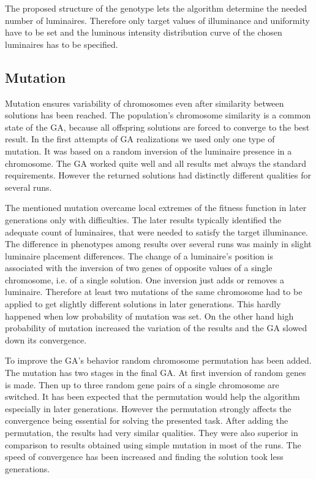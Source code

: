 The proposed structure of the genotype lets the algorithm determine the needed number of luminaires. Therefore only target values of illuminance and uniformity have to be set and the luminous intensity distribution curve of the chosen luminaires has to be specified.

\subsection{Mutation}
Mutation ensures variability of chromosomes even after similarity between solutions has been reached. The population's chromosome similarity is a common state of the GA, because all offspring solutions are forced to converge to the best result. In the first attempts of GA realizations we used only one type of mutation. It was based on a random inversion of the luminaire presence in a chromosome. The GA worked quite well and all results met always the standard requirements. However the returned solutions had distinctly different qualities for several runs.

The mentioned mutation overcame local extremes of the fitness function in later generations only with difficulties. The later results typically identified the adequate count of luminaires, that were needed to satisfy the target illuminance. The difference in phenotypes among results over several runs was mainly in slight luminaire placement differences. The change of a luminaire's position is associated with the inversion of two genes of opposite values of a single chromosome, i.e. of a single solution. One inversion just adds or removes a luminaire. Therefore at least two mutations of the same chromosome had to be applied to get slightly different solutions in later generations. This hardly happened when low probability of mutation was set. On the other hand high probability of mutation increased the variation of the results and the GA slowed down its convergence.

To improve the GA's behavior random chromosome permutation has been added. The mutation has two stages in the final GA. At first inversion of random genes is made. Then up to three random gene pairs of a single chromosome are switched. It has been expected that the permutation would help the algorithm especially in later generations. However the permutation strongly affects the convergence being essential for solving the presented task. After adding the permutation, the results had very similar qualities. They were also superior in comparison to results obtained using simple mutation in most of the runs. The speed of convergence has been increased and finding the solution took less generations.
